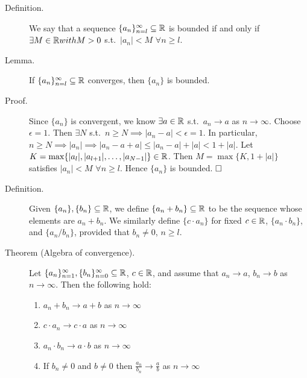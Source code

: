 \documentclass[letterpaper,11pt]{article}
\begin{document}
\begin{description}

\item[Definition.] We say that a sequence $\{a_n\}_{n=l}^\infty\subseteq\mathbb{R}$
    is bounded if and only if $\exists M\in\mathbb{R} with M>0$ s.t.\ $|a_n|<M$
    $\forall n\ge l$.

\item[Lemma.] If $\{a_n\}_{n=l}^\infty\subseteq\mathbb{R}$ converges, then
    $\{a_n\}$ is bounded.
\item[Proof.] Since $\{a_n\}$ is convergent, we know $\exists a\in\mathbb{R}$
    s.t.\ $a_n\to a$ as $n\to\infty$. Choose $\epsilon=1$. Then
    $\exists N$ s.t.\ $n\ge N\implies|a_n-a|<\epsilon=1$. In particular,
    $n\ge N\implies |a_n|\implies |a_n-a+a|\le|a_n-a|+|a|<1+|a|$.
    Let $K=\max\{|a_l|,|a_{l+1}|,\ldots,|a_{N-1}|\}\in\mathbb{R}$. Then
    $M=\max\{K,1+|a|\}$ satisfies $|a_n|<M$ $\forall n\ge l$.
    Hence $\{a_n\}$ is bounded. $\hfill\square$


\item[Definition.] Given $\{a_n\},\{b_n\}\subseteq\mathbb{R}$, we define
    $\{a_n+b_n\}\subseteq\mathbb{R}$ to be the sequence whose elements are
    $a_n+b_n$. We similarly define $\{c\cdot a_n\}$ for fixed $c\in\mathbb{R}$,
    $\{a_n\cdot b_n\}$, and $\{a_n/b_n\}$, provided that $b_n\ne0$, $n\ge l$.

\item[Theorem (Algebra of convergence).] Let $\{a_n\}_{n=1}^\infty,
    \{b_n\}_{n=0}^\infty\subseteq\mathbb{R}$,
    $c\in\mathbb{R}$, and assume that $a_n\to a$, $b_n\to b$ as $n\to\infty$. Then
    the following hold:
    \begin{enumerate}[(1)]
    \item $a_n+b_n\to a+b$ as $n\to\infty$
    \item $c\cdot a_n\to c\cdot a$ as $n\to\infty$
    \item $a_n\cdot b_n\to a\cdot b$ as $n\to\infty$
    \item If $b_n\ne 0$ and $b\ne0$ then
        $\frac{a_n}{b_n}\to\frac{a}{b}$ as $n\to\infty$
    \end{enumerate}


\end{description}
\end{document}

